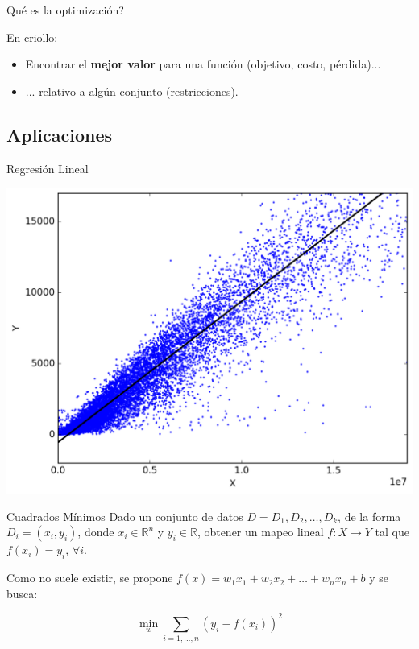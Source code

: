 \documentclass[12pt,aspectratio=169]{beamer}
\begin{document}
\begin{frame}{Qué es la optimización?}

En criollo:
\begin{itemize}
\item Encontrar el \textbf{mejor valor} para una función (objetivo, costo, pérdida)...
\item ... relativo a algún conjunto (restricciones).

\end{itemize}

\end{frame}

\subsection{Aplicaciones}
\begin{frame}{Regresión Lineal}
	\begin{center}
	\includegraphics[width=.6\paperwidth]{regression.png}
	\end{center}
\end{frame}

\begin{frame}{Cuadrados Mínimos}
Dado un conjunto de datos $D = {D_1, D_2, \dots, D_k}$, de la forma $D_i = (x_i, y_i)$, donde $x_i \in \mathbb{R}^n$ y $y_i \in \mathbb{R}$, obtener un mapeo lineal $f: X \rightarrow Y$ tal que $f(x_i) = y_i$, $\forall i$.

Como no suele existir, se propone $f(x) = w_1x_1 + w_2x_2 + \dots + w_nx_n + b$ y se busca:

$$
\min_w \sum_{i=1,\dots,n}(y_i - f(x_i))^2
$$

\end{frame}
\end{document}
